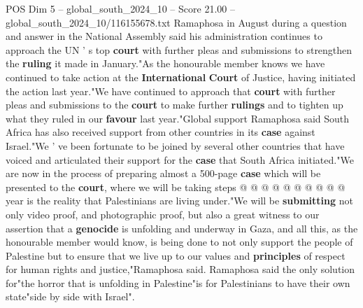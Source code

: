 \begin{textsample}{POS Dim 5 – global\_south\_2024\_10 – Score 21.00 – global\_south\_2024\_10/116155678.txt}
Ramaphosa in August during a question and answer in the National Assembly said his administration continues to approach the UN ' s top \textbf{court} with further pleas and submissions to strengthen the \textbf{ruling} it made in January."As the honourable member knows we have continued to take action at the \textbf{International} \textbf{Court} of Justice, having initiated the action last year."We have continued to approach that \textbf{court} with further pleas and submissions to the \textbf{court} to make further \textbf{rulings} and to tighten up what they ruled in our \textbf{favour} last year."Global support Ramaphosa said South Africa has also received support from other countries in its \textbf{case} against Israel."We ' ve been fortunate to be joined by several other countries that have voiced and articulated their support for the \textbf{case} that South Africa initiated."We are now in the process of preparing almost a 500-page \textbf{case} which will be presented to the \textbf{court}, where we will be taking steps @ @ @ @ @ @ @ @ @ @ year is the reality that Palestinians are living under."We will be \textbf{submitting} not only video proof, and photographic proof, but also a great witness to our assertion that a \textbf{genocide} is unfolding and underway in Gaza, and all this, as the honourable member would know, is being done to not only support the people of Palestine but to ensure that we live up to our values and \textbf{principles} of respect for human rights and justice,"Ramaphosa said.
Ramaphosa said the only solution for"the horror that is unfolding in Palestine"is for Palestinians to have their own state"side by side with Israel".

\end{textsample}
